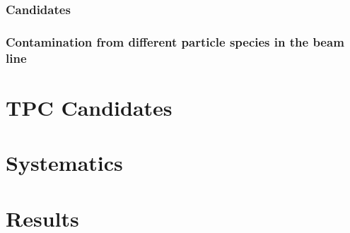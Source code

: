\subsubsection{Candidates}\label{sec:Candidates}
\subsubsection{Contamination from different particle species in the beam line }\label{sec:Contamination}
\section{TPC Candidates} \label{sec:TPC} 
\section{Systematics} \label{sec:Systematics} 
\section{Results}\label{sec:Results}
